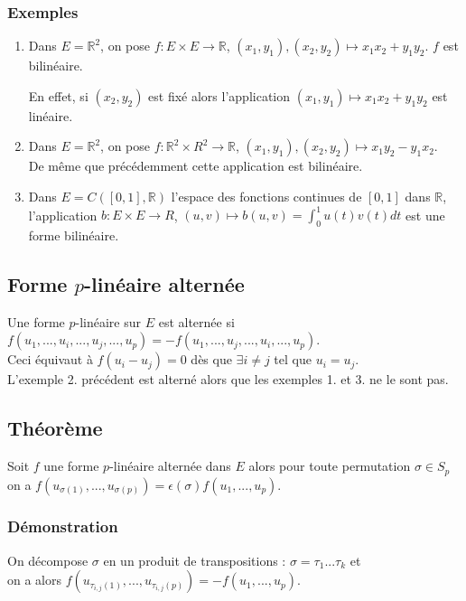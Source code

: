 \documentclass[a4paper,10pt]{book} %
\newcommand{\R}{\mathbb{R}}
\newcommand{\displayAmath}{\displaystyle}
\begin{document}
\subsubsection{Exemples}
\begin{enumerate}
\item Dans $E=\R^2$, on pose $f: E\times E\rightarrow \R$, $(x_1,y_1),(x_2,y_2)\mapsto x_1x_2+y_1y_2$.
$f$ est bilinéaire.\smallskip

En effet, si $(x_2,y_2)$ est fixé alors l'application $(x_1,y_1)\mapsto x_1x_2+y_1y_2$ est linéaire.

\item Dans $E=\R^2$, on pose $f:\R^2\times R^2\rightarrow \R$, $(x_1,y_1),(x_2,y_2)\mapsto x_1y_2-y_1x_2$.\\De même que précédemment cette application est bilinéaire.

\item Dans $E=C([0,1],\R)$ l'espace des fonctions continues de $[0,1]$ dans $\R$,\\ l'application $b : E\times E \rightarrow R$, $(u,v)\mapsto b(u,v)=\displayAmath\int_0^1u(t)v(t)dt$ est une forme bilinéaire.
\end{enumerate}

\subsection{Forme $p$-linéaire alternée}
Une forme $p$-linéaire sur $E$ est alternée si $f(u_1,...,u_i,...,u_j,...,u_p)=-f(u_1,...,u_j,...,u_i,...,u_p)$.\\

Ceci équivaut à $f(u_i-u_j)=0$ dès que $\exists i\neq j$ tel que $u_i=u_j$.\\
L'exemple 2. précédent est alterné alors que les exemples 1. et 3. ne le sont pas.

\subsection{Théorème}
Soit $f$ une forme $p$-linéaire alternée dans $E$ alors pour toute permutation $\sigma\in S_p$ \\on a $f(u_{\sigma(1)},...,u_{\sigma(p)})=\epsilon(\sigma)f(u_1,...,u_p)$.

\subsubsection{Démonstration}
On décompose $\sigma$ en un produit de transpositions : $\sigma=\tau_1...\tau_k$ et\\on a alors $f(u_{\tau_{i,j}(1)},...,u_{\tau_{i,j}(p)})=-f(u_1,...,u_p)$.
\end{document}
